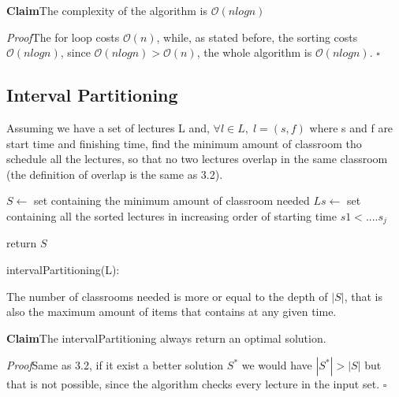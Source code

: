 \documentclass[11pt]{article}
\newenvironment{claim}[1]{\par\textbf{Claim}\space#1}{}
\newenvironment{proof}[1]{\\\par\textit{Proof}\space#1}{\hfill\ensuremath{\square}}
\begin{document}
\begin{claim}
The complexity of the algorithm is $\mathcal{O}{(nlogn)}$
\end{claim}
\begin{proof}
The for loop costs $\mathcal{O}{(n)}$, while, as stated before, the sorting costs $\mathcal{O}{(nlogn)}$, since $\mathcal{O}{(nlogn)} > \mathcal{O}{(n)}$, the whole algorithm is $\mathcal{O}{(nlogn)}.$
\end{proof}\\

\subsection{Interval Partitioning}
Assuming we have a set of lectures L and, $\forall l \in L ,\; l=(s,f)$ where s and f are start time and finishing time, find the minimum amount of classroom tho schedule all the lectures, so that no two lectures overlap in the same classroom (the definition of overlap is the same as 3.2).

\begin{algorithm}[H]
\SetAlgoLined
\small
{}
\BlankLine

$S \leftarrow$ set containing the minimum amount of classroom needed\;
$Ls \leftarrow$ set containing all the sorted lectures in increasing order of starting time $s1 < .... s_{j}$

\BlankLine
{}  

\BlankLine

return $S$\;
\caption{intervalPartitioning(L):}
\end{algorithm}

The number of classrooms needed is more or equal to the depth of $|S|$, that is also the maximum amount of items that contains at any given time.	\\

\begin{claim}
The intervalPartitioning always return an optimal solution.
\end{claim}
\begin{proof}
Same as 3.2, if it exist a better solution $S^{*}$ we would have $|S^{*}| > |S|$ but that is not possible, since the algorithm checks every lecture in the input set. 
\end{proof}\\
 
\end{document}

